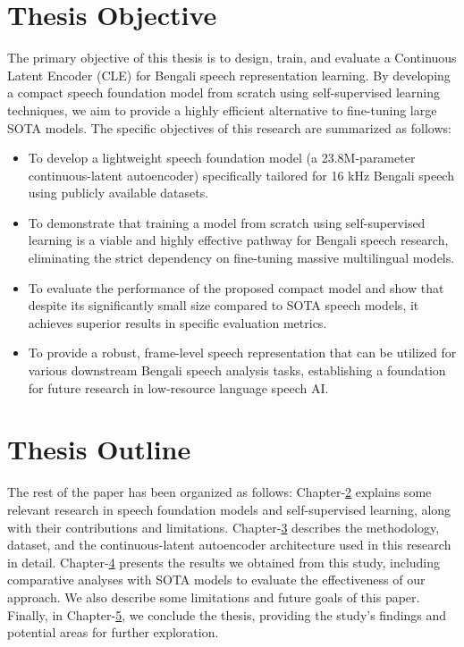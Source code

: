 \section{Thesis Objective}
The primary objective of this thesis is to design, train, and evaluate a Continuous Latent Encoder (CLE) for Bengali speech representation learning. By developing a compact speech foundation model from scratch using self-supervised learning techniques, we aim to provide a highly efficient alternative to fine-tuning large SOTA models. The specific objectives of this research are summarized as follows:

\begin{itemize}
    \item To develop a lightweight speech foundation model (a 23.8M-parameter continuous-latent autoencoder) specifically tailored for 16 kHz Bengali speech using publicly available datasets.
    \item To demonstrate that training a model from scratch using self-supervised learning is a viable and highly effective pathway for Bengali speech research, eliminating the strict dependency on fine-tuning massive multilingual models.
    \item To evaluate the performance of the proposed compact model and show that despite its significantly small size compared to SOTA speech models, it achieves superior results in specific evaluation metrics.
    \item To provide a robust, frame-level speech representation that can be utilized for various downstream Bengali speech analysis tasks, establishing a foundation for future research in low-resource language speech AI.
\end{itemize}

\section{Thesis Outline}
The rest of the paper has been organized as follows: Chapter-\hyperref[related_work]{2} explains some relevant research in speech foundation models and self-supervised learning, along with their contributions and limitations. Chapter-\hyperref[methodology]{3} describes the methodology, dataset, and the continuous-latent autoencoder architecture used in this research in detail. Chapter-\hyperref[result_and_analysis]{4} presents the results we obtained from this study, including comparative analyses with SOTA models to evaluate the effectiveness of our approach. We also describe some limitations and future goals of this paper. Finally, in Chapter-\hyperref[conclusion]{5}, we conclude the thesis, providing the study's findings and potential areas for further exploration.

